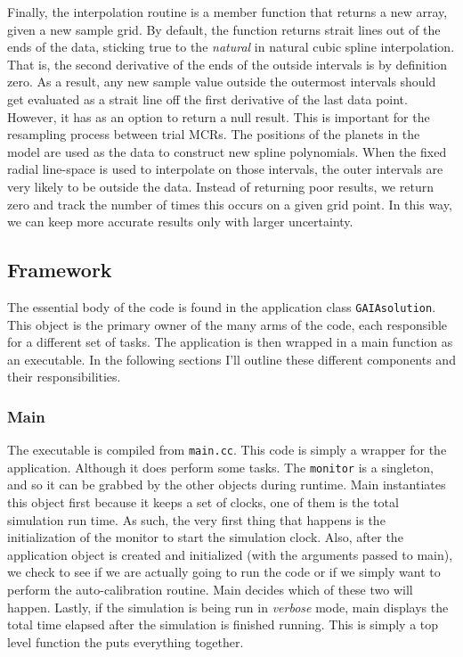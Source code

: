 \documentclass[10pt,a4paper,final]{article}
\numberwithin{equation}{section}
\begin{document}
\begin{multicols}{2}[]
				Finally, the interpolation routine is a member function that returns
				a new array, given a new sample grid. By default, the function
				returns strait lines out of the ends of the data, sticking true to the
				\textit{natural} in natural cubic spline interpolation. That is,
				the second derivative of the ends of the outside intervals is by definition
				zero. As a result, any new sample value outside the outermost intervals
				should get evaluated as a strait line off the first derivative of the last
				data point. However, it has as an option to return a null result. This is
				important for the resampling process between trial MCRs. The positions
				of the planets in the model are used as the data to construct new spline
				polynomials. When the fixed radial line-space is used to interpolate on
				those intervals, the outer intervals are very likely to be outside the
				data. Instead of returning poor results, we return zero and track the number
				of times this occurs on a given grid point. In this way, we can keep more
				accurate results only with larger uncertainty.

			\subsection{Framework}

				The essential body of the code is found in the application class
				\texttt{GAIAsolution}. This object is the primary owner of the many
				arms of the code, each responsible for a different set of tasks.
				The application is then wrapped in a main function as an executable.
				In the following sections I'll outline these different components
				and their responsibilities.

			\subsubsection{Main}
				
				The executable is compiled from \texttt{main.cc}. This code is simply
				a wrapper for the application. Although it does perform some tasks.
				The \texttt{monitor} is a singleton, and so it can be grabbed by the
				other objects during runtime. Main instantiates this object first
				because it keeps a set of clocks, one of them is the total simulation
				run time. As such, the very first thing that happens is the initialization
				of the monitor to start the simulation clock. Also, after the application
				object is created and initialized (with the arguments passed to main),
				we check to see if we are actually going to run the code or if we simply
				want to perform the auto-calibration routine. Main decides which of these
				two will happen. Lastly, if the simulation is being run in \textit{verbose}
				mode, main displays the total time elapsed after the simulation is finished
				running. This is simply a top level function the puts everything together.


\end{multicols}
\end{document}
